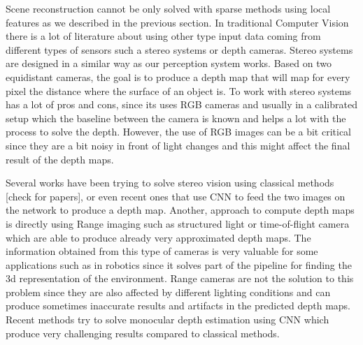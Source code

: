 Scene reconstruction cannot be only solved with sparse methods using local features as we described in the previous section. In traditional Computer Vision there is a lot of literature about using other type input data coming from different types of sensors such a stereo systems or depth cameras. Stereo systems are designed in a similar way as our perception system works. Based on two equidistant cameras, the goal is to produce a depth map that will map for every pixel the distance where the surface of an object is. To work with stereo systems has a lot of pros and cons, since its uses RGB cameras and usually in a calibrated setup which the baseline between the camera is known and helps a lot with the process to solve the depth. However, the use of RGB images can be a bit critical since they are a bit noisy in front of light changes and this might affect the final result of the depth maps.

Several works have been trying to solve stereo vision using classical methods [check for papers], or even recent ones that use CNN to feed the two images on the network to produce a depth map. Another, approach to compute depth maps is directly using Range imaging such as structured light or time-of-flight camera which are able to produce already very approximated depth maps. The information obtained from this type of cameras is very valuable for some applications such as in robotics since it solves part of the pipeline for finding the 3d representation of the environment. Range cameras are not the solution to this problem since they are also affected by different lighting conditions and can produce sometimes inaccurate results and artifacts in the predicted depth maps. Recent methods try to solve monocular depth estimation using CNN which produce very challenging results compared to classical methods.

